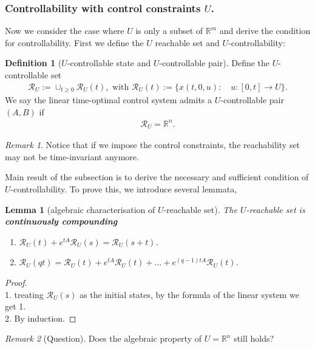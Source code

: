 \documentclass[a4paper,11pt,fleqn]{book}
\newtheorem{lemma}[theorem]{Lemma}
\theoremstyle{definition}
\newtheorem{definition}{Definition}[section]
\theoremstyle{remark}
\newtheorem*{remark}{Remark}
\begin{document}
\subsubsection{Controllability with control constraints $U$.}
Now we consider the case where $U$ is only a subset of $\mathbb{R}^m$ and derive the condition for controllability. First we define the $U$ reachable set and $U$-controllability:

\begin{definition}[$U$-controllable state and $U$-controllable pair]
Define the $U$-controllable set
\begin{align*}
	\mathcal{R}_U := \cup_{t \ge 0} \mathcal{R}_U(t), \text{ with } \mathcal{R}_U(t):= \{ x(t, 0, u): \quad u :[0, t] \rightarrow U\}.
\end{align*}
We say the linear time-optimal control system admits a $U$-controllable pair $(A, B)$ if 
\begin{align*}
	\mathcal{R}_U = \mathbb{R}^n. 
\end{align*}
\end{definition}
\begin{remark}
Notice that if we impose the control constraints, the reachability set may not be time-invariant anymore. 	
\end{remark}

Main result of the subsection is to derive the necessary and sufficient condition of $U$-controllability. To prove this, we introduce several lemmata, 

\begin{lemma}[algebraic characterisation of $U$-reachable set]
	The $U$-reachable set is \textbf{continuously compounding}
	\begin{enumerate}
		\item $\mathcal{R}_U(t) + e^{t A} \mathcal{R}_U(s) = \mathcal{R}_U(s + t)$. 
		\item $\mathcal{R}_U(qt) = \mathcal{R}_U(t) + e^{tA}\mathcal{R}_U(t) + \dots + e^{(q - 1)tA} \mathcal{R}_U(t)$. 
	\end{enumerate}
\end{lemma}
\begin{proof}
	\quad\\
	1. treating $\mathcal{R}_U(s)$ as the initial states, by the formula of the linear system we get 1. \\
	2. By induction. 
\end{proof}
\begin{remark}[Question]
	Does the algebraic property of $U = \mathbb{R}^n$ still holds? 
\end{remark}
\end{document}
